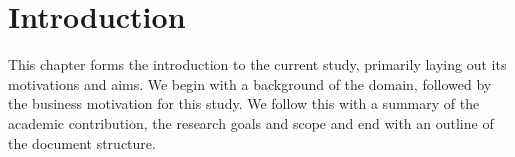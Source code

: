 %
%
%
%
\chapter{Introduction}\label{C.intro}
{This chapter forms the introduction to the current study, primarily laying out its motivations and aims. We begin with a background of the domain, followed by the business motivation for this study. We follow this with a summary of the academic contribution, the research goals and scope and end with an outline of the document structure.  }
